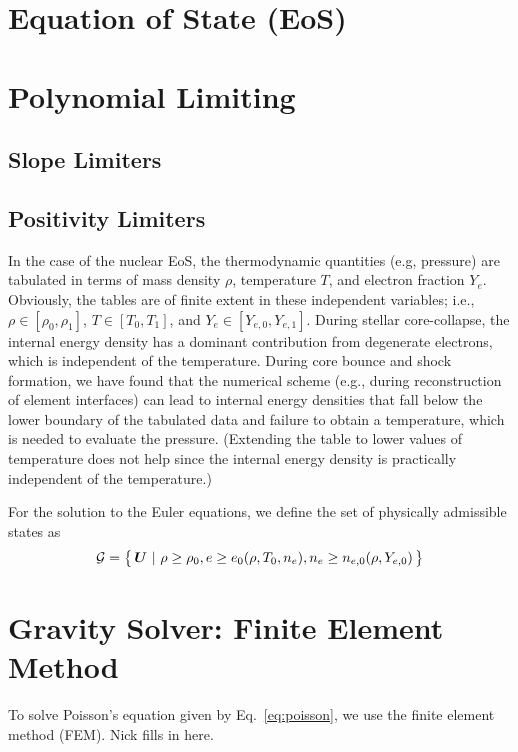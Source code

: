 \documentclass[10pt,preprint]{aastex}
\newcommand{\ee}[1]{{\color{red} #1}}
\begin{document}
\section{Equation of State (EoS)}

\section{Polynomial Limiting}

\subsection{Slope Limiters}

\subsection{Positivity Limiters}

In the case of the nuclear EoS, the thermodynamic quantities (e.g, pressure) are tabulated in terms of mass density $\rho$, temperature $T$, and electron fraction $Y_{e}$.  
Obviously, the tables are of finite extent in these independent variables; i.e., $\rho\in[\rho_{0},\rho_{1}]$, $T\in[T_{0},T_{1}]$, and $Y_{e}\in[Y_{e,0},Y_{e,1}]$.  
During stellar core-collapse, the internal energy density has a dominant contribution from degenerate electrons, which is independent of the temperature.  
During core bounce and shock formation, we have found that the numerical scheme (e.g., during reconstruction of element interfaces) can lead to internal energy densities that fall below the lower boundary of the tabulated data and failure to obtain a temperature, which is needed to evaluate the pressure.  
(Extending the table to lower values of temperature does not help since the internal energy density is practically independent of the temperature.)

For the solution to the Euler equations, we define the set of physically admissible states as
\begin{equation}
  \mathcal{G}=\big\{\,\boldsymbol{U}~|~\rho\ge\rho_{0}, e\ge e_{0}(\rho,T_{0},n_{e}),n_{e}\ge n_{e,0}(\rho,Y_{e,0})\,\big\}
\end{equation}


\section{Gravity Solver: Finite Element Method}
\label{sec:FiniteElementMethod}

To solve Poisson's equation given by Eq.~\eqref{eq:poisson}, we use the finite element method (FEM).  
\ee{Nick fills in here}.  
\end{document}
